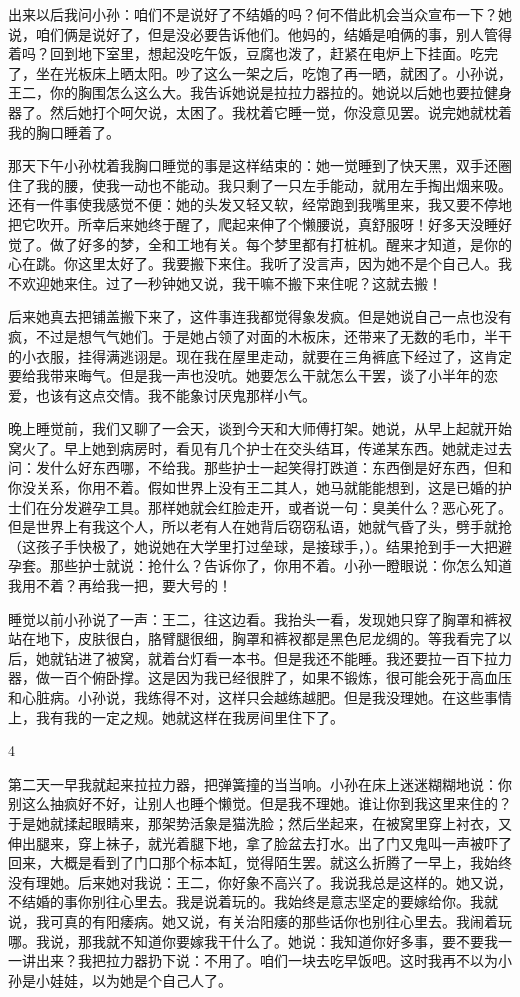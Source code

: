 出来以后我问小孙：咱们不是说好了不结婚的吗？何不借此机会当众宣布一下？她说，咱们俩是说好了，但是没必要告诉他们。他妈的，结婚是咱俩的事，别人管得着吗？回到地下室里，想起没吃午饭，豆腐也泼了，赶紧在电炉上下挂面。吃完了，坐在光板床上晒太阳。吵了这么一架之后，吃饱了再一晒，就困了。小孙说，王二，你的胸围怎么这么大。我告诉她说是拉拉力器拉的。她说以后她也要拉健身器了。然后她打个呵欠说，太困了。我枕着它睡一觉，你没意见罢。说完她就枕着我的胸口睡着了。 

那天下午小孙枕着我胸口睡觉的事是这样结束的：她一觉睡到了快天黑，双手还圈住了我的腰，使我一动也不能动。我只剩了一只左手能动，就用左手掏出烟来吸。还有一件事使我感觉不便：她的头发又轻又软，经常跑到我嘴里来，我又要不停地把它吹开。所幸后来她终于醒了，爬起来伸了个懒腰说，真舒服呀！好多天没睡好觉了。做了好多的梦，全和工地有关。每个梦里都有打桩机。醒来才知道，是你的心在跳。你这里太好了。我要搬下来住。我听了没言声，因为她不是个自己人。我不欢迎她来住。过了一秒钟她又说，我干嘛不搬下来住呢？这就去搬！ 

后来她真去把铺盖搬下来了，这件事连我都觉得象发疯。但是她说自己一点也没有疯，不过是想气气她们。于是她占领了对面的木板床，还带来了无数的毛巾，半干的小衣服，挂得满逃诩是。现在我在屋里走动，就要在三角裤底下经过了，这肯定要给我带来晦气。但是我一声也没吭。她要怎么干就怎么干罢，谈了小半年的恋爱，也该有这点交情。我不能象讨厌鬼那样小气。 

晚上睡觉前，我们又聊了一会天，谈到今天和大师傅打架。她说，从早上起就开始窝火了。早上她到病房时，看见有几个护士在交头结耳，传递某东西。她就走过去问：发什么好东西哪，不给我。那些护士一起笑得打跌道：东西倒是好东西，但和你没关系，你用不着。假如世界上没有王二其人，她马就能能想到，这是已婚的护士们在分发避孕工具。那样她就会红脸走开，或者说一句：臭美什么？恶心死了。但是世界上有我这个人，所以老有人在她背后窃窃私语，她就气昏了头，劈手就抢（这孩子手快极了，她说她在大学里打过垒球，是接球手，）。结果抢到手一大把避孕套。那些护士就说：抢什么？告诉你了，你用不着。小孙一瞪眼说：你怎么知道我用不着？再给我一把，要大号的！ 

睡觉以前小孙说了一声：王二，往这边看。我抬头一看，发现她只穿了胸罩和裤衩站在地下，皮肤很白，胳臂腿很细，胸罩和裤衩都是黑色尼龙绸的。等我看完了以后，她就钻进了被窝，就着台灯看一本书。但是我还不能睡。我还要拉一百下拉力器，做一百个俯卧撑。这是因为我已经很胖了，如果不锻炼，很可能会死于高血压和心脏病。小孙说，我练得不对，这样只会越练越肥。但是我没理她。在这些事情上，我有我的一定之规。她就这样在我房间里住下了。 

4 

第二天一早我就起来拉拉力器，把弹簧撞的当当响。小孙在床上迷迷糊糊地说：你别这么抽疯好不好，让别人也睡个懒觉。但是我不理她。谁让你到我这里来住的？于是她就揉起眼睛来，那架势活象是猫洗脸；然后坐起来，在被窝里穿上衬衣，又伸出腿来，穿上袜子，就光着腿下地，拿了脸盆去打水。出了门又鬼叫一声被吓了回来，大概是看到了门口那个标本缸，觉得陌生罢。就这么折腾了一早上，我始终没有理她。后来她对我说：王二，你好象不高兴了。我说我总是这样的。她又说，不结婚的事你别往心里去。我是说着玩的。我始终是意志坚定的要嫁给你。我就说，我可真的有阳痿病。她又说，有关治阳痿的那些话你也别往心里去。我闹着玩哪。我说，那我就不知道你要嫁我干什么了。她说：我知道你好多事，要不要我一一讲出来？我把拉力器扔下说：不用了。咱们一块去吃早饭吧。这时我再不以为小孙是小娃娃，以为她是个自己人了。 

